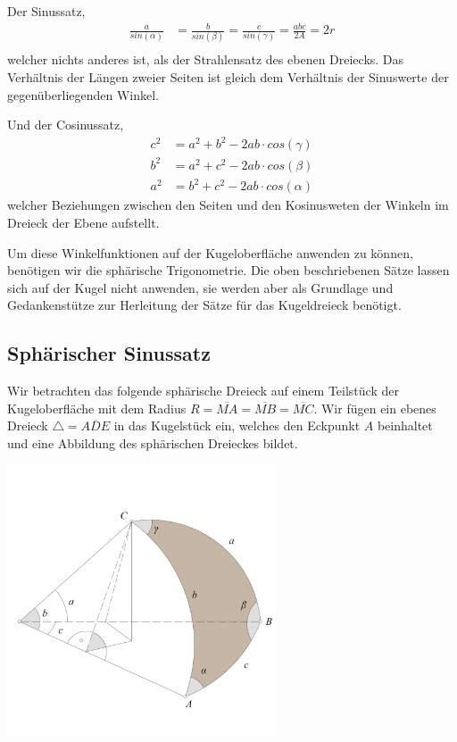 \begin{refsection}
Der Sinussatz,
\begin{align*}
\frac{ a }{ sin(\alpha) } &= \frac{ b }{sin(\beta)} = \frac{ c }{ sin(\gamma) } = \frac{abc}{2A} = 2r\\
\end{align*}
welcher nichts anderes ist, als der Strahlensatz des ebenen Dreiecks. Das Verhältnis der Längen zweier Seiten ist gleich dem Verhältnis der Sinuswerte der gegenüberliegenden Winkel.

Und der Cosinussatz,
\begin{align*}
c^{ 2 } &= a^{ 2 } + b^{ 2 } - 2ab\cdot cos(\gamma)\\
b^{ 2 } &= a^{ 2 } + c^{ 2 } - 2ab\cdot cos(\beta)\\
a^{ 2 } &= b^{ 2 } + c^{ 2 } - 2ab\cdot cos(\alpha)
\end{align*}
welcher Beziehungen zwischen den Seiten und den Kosinusweten der Winkeln im Dreieck der Ebene aufstellt.

Um diese Winkelfunktionen auf der Kugeloberfläche anwenden zu können, benötigen wir die sphärische Trigonometrie. Die oben beschriebenen Sätze lassen sich auf der Kugel nicht anwenden, sie werden aber als Grundlage und Gedankenstütze zur Herleitung der Sätze für das Kugeldreieck benötigt.



\subsection{Sphärischer Sinussatz}
Wir betrachten das folgende sphärische Dreieck auf einem Teilstück der Kugeloberfläche mit dem Radius $R= \overline{MA} = \overline{MB} = \overline{MC}$. Wir fügen ein ebenes Dreieck $\triangle=\overline{ADE}$ in das Kugelstück ein, welches den Eckpunkt $A$ beinhaltet und eine Abbildung des sphärischen Dreieckes bildet.

\begin{center}
        \includegraphics[width=0.6\textwidth]{kugel/Sinussatz.jpg}
\end{center}


\end{refsection}
